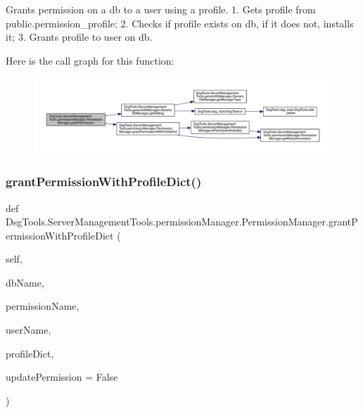 \begin{DoxyVerb}Grants permission on a db to a user using a profile.
1. Gets profile from public.permission_profile;
2. Checks if profile exists on db, if it does not, installs it;
3. Grants profile to user on db.
\end{DoxyVerb}
 Here is the call graph for this function\+:
\nopagebreak
\begin{figure}[H]
\begin{center}
\leavevmode
\includegraphics[width=350pt]{class_dsg_tools_1_1_server_management_tools_1_1permission_manager_1_1_permission_manager_a9c74d6bdc2984793dfc39d964893819a_cgraph}
\end{center}
\end{figure}
\mbox{\label{class_dsg_tools_1_1_server_management_tools_1_1permission_manager_1_1_permission_manager_ac2a41f0388c97371d3e00f30e66519b6}} 
\subsubsection{\texorpdfstring{grant\+Permission\+With\+Profile\+Dict()}{grantPermissionWithProfileDict()}}
{\footnotesize\ttfamily def Dsg\+Tools.\+Server\+Management\+Tools.\+permission\+Manager.\+Permission\+Manager.\+grant\+Permission\+With\+Profile\+Dict (\begin{DoxyParamCaption}\item[{}]{self,  }\item[{}]{db\+Name,  }\item[{}]{permission\+Name,  }\item[{}]{user\+Name,  }\item[{}]{profile\+Dict,  }\item[{}]{update\+Permission = {\ttfamily False} }\end{DoxyParamCaption})}


